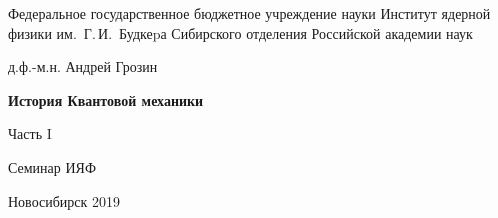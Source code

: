 \documentclass[12pt,pagesize,paper=landscape,paper=192mm:108mm]{scrbook}
\begin{document}
\begin{titlepage}
  \vspace*{-0.5em}
  \begin{center}    
    \hspace*{3em}
     Федеральное государственное бюджетное учреждение науки Институт ядерной физики им.~Г.\,И.~Будкеpа Сибирского отделения Российской академии наук
    
    \vfill

    \Large
    д.ф.-м.н. Андрей Грозин
    
    \bigskip

    \huge
    \textbf{История Квантовой механики}

    Часть I
    \vfill

    \Large
    Семинар ИЯФ 
    \vfill

    \normalsize

    \normalsize \ccbysa\hspace{0.5em}  Новосибирск 2019
  \end{center}
\end{titlepage}
\end{document}
